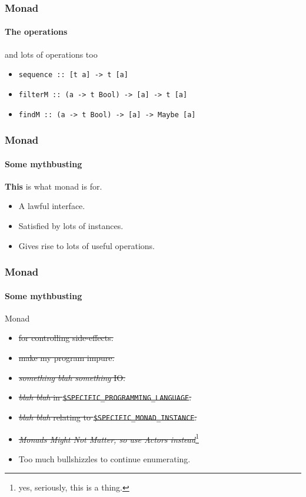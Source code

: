 \begin{frame}[fragile]
\frametitle{Monad}
\framesubtitle{The operations}
\begin{block}{and lots of operations too}
\begin{itemize}
\item \lstinline{sequence :: [t a] -> t [a]}
\item \lstinline{filterM :: (a -> t Bool) -> [a] -> t [a]}
\item \lstinline{findM :: (a -> t Bool) -> [a] -> Maybe [a]}
\end{itemize}
\end{block}
\end{frame}

\begin{frame}[fragile]
\frametitle{Monad}
\framesubtitle{Some mythbusting}
\begin{center}
\textbf{This} is what monad is for.
\end{center}
\begin{center}
\begin{itemize}
\item A lawful interface.
\item Satisfied by lots of instances.
\item Gives rise to lots of useful operations.
\end{itemize}
\end{center}
\end{frame}

\begin{frame}[fragile]
\frametitle{Monad}
\framesubtitle{Some mythbusting}
\begin{block}{Monad}
\begin{itemize}
\item<1-> \sout{for controlling side-effects.}
\item<2-> \sout{make my program impure.}
\item<3-> \sout{\emph{something blah something} IO.}
\item<4-> \sout{\emph{blah blah} in \lstinline{$SPECIFIC_PROGRAMMING_LANGUAGE}.}
\item<5-> \sout{\emph{blah blah} relating to \lstinline{$SPECIFIC_MONAD_INSTANCE}.}
\item<6-> \sout{\emph{Monads Might Not Matter, so use Actors instead}}\footnote{yes, seriously, this is a thing.}
\item<7-> Too much bullshizzles to continue enumerating.
\end{itemize}
\end{block}
\end{frame}
